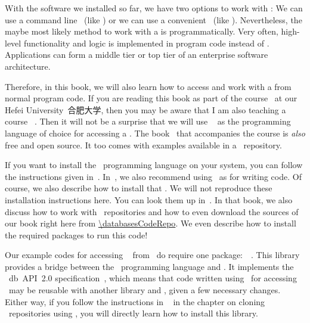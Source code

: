 %
%
With the software we installed so far, we have two options to work with :
We can use a command line ~(like \psql) or we can use a convenient ~(like \libreofficeBase).
Nevertheless, the maybe most likely method to work with a  is programmatically.
Very often, high-level functionality and logic is implemented in program code instead of \sql.
Applications can form a middle tier or top tier of an enterprise software architecture.

Therefore, in this book, we will also learn how to access and work with a  from normal program code.
If you are reading this book as part of the  course~\cite{databases} at our Hefei University~合肥大学, then you may be aware that I am also teaching a course ~\cite{programmingWithPython}.
Then it will not be a surprise that we will use \python~\cite{H2023ABGTP3P,LH2015DSAAWP,programmingWithPython} as the programming language of choice for accessing a .
The book~\cite{programmingWithPython} that accompanies the  course is \emph{also} free and open source.
It too comes with examples available in a \github\ repository.

If you want to install the \python\ programming language on your system, you can follow the instructions given in~\cite{programmingWithPython}.
In~\cite{programmingWithPython}, we also recommend using \pycharm\ as  for writing code.
Of course, we also describe how to install that .
We will not reproduce these installation instructions here.
You can look them up in~\cite{programmingWithPython}.
In that book, we also discuss how to work with \git\ repositories and how to even download the sources of our book right here from \url{\databasesCodeRepo}.
We even describe how to install the required packages to run this code!%
%
\begin{sloppypar}%
Our example codes for accessing \postgresql\  from \python\ do require one package:~\psycopg~\cite{VDGE2010P}.
This library provides a bridge between the \python\ programming language and \postgresql.
It implements the \python~\acrshort{db}~\acrshort{API}~2.0 specification~\cite{PEP249}, which means that code written using \psycopg\ for accessing \postgresql\ may be reusable with another library and , given a few necessary changes.
Either way, if you follow the instructions in ~\cite{programmingWithPython} in the chapter on cloning \git~repositories using \pycharm, you will directly learn how to install this library.%
\end{sloppypar}%
%
%
%
\endhsection%
